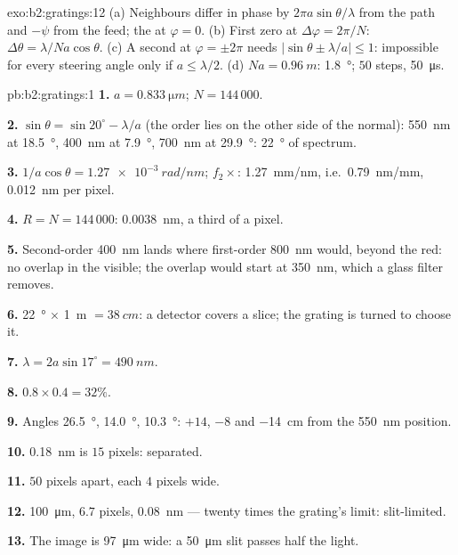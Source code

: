 \begin{solution}{exo:b2:gratings:12}
(a) Neighbours differ in phase by $2\pi a\sin\theta/\lambda$ from the path and $-\psi$
from the feed; the  at $\varphi = 0$. (b) First zero at
$\Delta\varphi = 2\pi/N$: $\Delta\theta = \lambda/Na\cos\theta$. (c) A second  at
$\varphi = \pm2\pi$ needs $|\sin\theta \pm \lambda/a| \le 1$: impossible for every steering
angle only if $a \le \lambda/2$. (d) $Na = \qty{0.96}{m}$: \qty{1.8}{\degree}; $50$ steps,
\qty{50}{\micro s}.
\end{solution}

\begin{solution}{pb:b2:gratings:1}
\textbf{1.} $a = \qty{0.833}{\micro m}$; $N = 144\,000$.

\textbf{2.} $\sin\theta = \sin20^\circ - \lambda/a$ (the order lies on the other side of
the normal): \qty{550}{nm} at \qty{18.5}{\degree}, \qty{400}{nm} at \qty{7.9}{\degree}, \qty{700}{nm} at
\qty{29.9}{\degree}: \qty{22}{\degree} of spectrum.

\textbf{3.} $1/a\cos\theta = \qty{1.27e-3}{rad/nm}$; $f_2\times$: \qty{1.27}{mm/nm}, i.e.\
\qty{0.79}{nm/mm}, \qty{0.012}{nm} per pixel.

\textbf{4.} $R = N = 144\,000$: \qty{0.0038}{nm}, a third of a pixel.

\textbf{5.} Second-order \qty{400}{nm} lands where first-order \qty{800}{nm}
would, beyond the red: no overlap in the visible; the overlap would
start at \qty{350}{nm}, which a glass filter removes.

\textbf{6.} \qty{22}{\degree} $\times$ \qty{1}{m} $= \qty{38}{cm}$: a detector covers a slice;
the grating is turned to choose it.

\textbf{7.} $\lambda = 2a\sin17^\circ = \qty{490}{nm}$.

\textbf{8.} $0.8 \times 0.4 = 32\%$.

\textbf{9.} Angles \qty{26.5}{\degree}, \qty{14.0}{\degree}, \qty{10.3}{\degree}: $+14$, $-8$ and
\qty{-14}{cm} from the \qty{550}{nm} position.

\textbf{10.} \qty{0.18}{nm} is $15$ pixels: separated.

\textbf{11.} $50$ pixels apart, each $4$ pixels wide.

\textbf{12.} \qty{100}{\micro m}, $6.7$ pixels, \qty{0.08}{nm} --- twenty times the
grating's limit: slit-limited.

\textbf{13.} The image is \qty{97}{\micro m} wide: a \qty{50}{\micro m} slit passes
half the light.


\end{solution}
